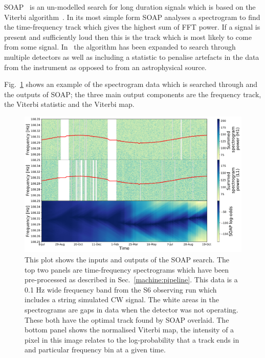 %
SOAP~\cite{bayley2019SOAPGeneralised} is an un-modelled search for long
duration signals which is based on the Viterbi
algorithm~\cite{viterbi1967ErrorBounds}. In its most simple form SOAP
analyses a spectrogram to find the time-frequency track which gives the highest
sum of \gls{FFT} power. If a signal is present and sufficiently loud then this
is the track which is most likely to come from some signal.
In~\cite{bayley2019SOAPGeneralised} the algorithm has been expanded to
search through multiple detectors as well as including a statistic to penalise
artefacts in the data from the instrument as opposed to from an astrophysical
source. 

%
Fig.~\ref{soap:viterbiplot} shows an example of the spectrogram data which is
searched through and the outputs of SOAP; the three main output components are
the frequency track, the Viterbi statistic and the Viterbi map.

\begin{figure}[ht]
	\includegraphics[scale=0.43]{C4_cnn/two_vit_example.pdf}
	\caption[Example SOAP output from H1 and L1 input spectrograms. ]{\label{soap:viterbiplot} This plot shows the inputs and outputs of the
		SOAP search. The top two panels are time-frequency spectrograms which have been pre-processed as described in Sec.~\ref{machine:pipeline}. This
		data is a 0.1 Hz wide frequency band from the S6 observing run \cite{}  which includes a string simulated \gls{CW} signal. The white areas in the spectrograms are gaps in data when the detector was not operating. These both have the
		optimal track found by SOAP overlaid. The bottom panel shows the normalised Viterbi map, the intensity of a
		pixel in this image relates to the log-probability that a track ends in and
		particular frequency bin at a given time.}
\end{figure}


